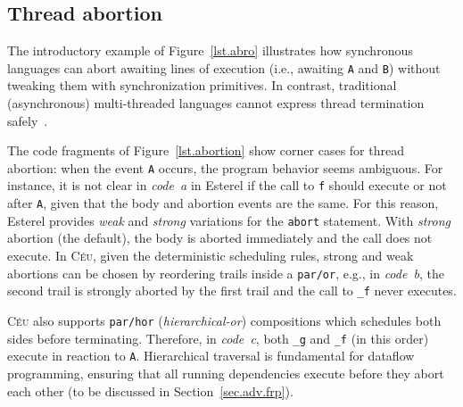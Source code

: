 \documentclass{sigplanconf}
\newcommand{\CEU}{\textsc{C\'{e}u}\xspace}
\newcommand{\code}[1] {{\small{\texttt{#1}}}}
\newcommand{\1}{\;}
\newcommand{\2}{\;\;}
\newcommand{\3}{\;\;\;}
\newcommand{\5}{\;\;\;\;\;}
\begin{document}
\subsection{Thread abortion}
\label{sec.ceu.abrt}

The introductory example of Figure~\ref{lst.abro} illustrates how synchronous 
languages can abort awaiting lines of execution (i.e., awaiting \code{A} and 
\code{B}) without tweaking them with synchronization primitives.
In contrast, traditional (asynchronous) multi-threaded languages cannot express 
thread termination safely~\cite{esterel.preemption,sync_async.threadsstop}.

The code fragments of Figure~\ref{lst.abortion} show corner cases for thread 
abortion: when the event \code{A} occurs, the program behavior seems ambiguous.
%
For instance, it is not clear in \emph{code~a} in Esterel if the call to 
\code{f} should execute or not after \code{A}, given that the body and abortion 
events are the same.
%
For this reason, Esterel provides \emph{weak} and \emph{strong} variations for 
the \code{abort} statement.
With \emph{strong} abortion (the default), the body is aborted immediately and 
the call does not execute.
%
In \CEU, given the deterministic scheduling rules, strong and weak abortions 
can be chosen by reordering trails inside a \code{par/or}, e.g., in 
\emph{code~b}, the second trail is strongly aborted by the first trail and the 
call to \code{\_f} never executes.

\CEU also supports \code{par/hor} (\emph{hierarchical-or}) compositions which 
schedules both sides before terminating.
Therefore, in \emph{code~c}, both \code{\_g} and \code{\_f} (in this order) 
execute in reaction to \code{A}.
Hierarchical traversal is fundamental for dataflow programming, ensuring that 
all running dependencies execute before they abort each other (to be discussed 
in Section~\ref{sec.adv.frp}).

\end{document}
